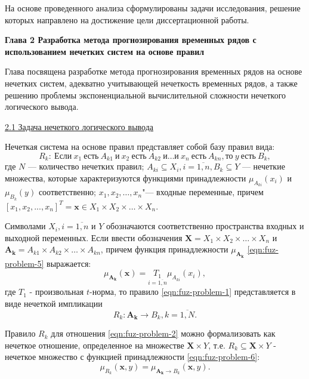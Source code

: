 На основе проведенного анализа сформулированы задачи исследования, решение которых направлено на достижение цели диссертационной работы.

\textbf{Глава 2 Разработка метода прогнозирования временных рядов с использованием нечетких систем на основе правил}

Глава посвящена разработке метода прогнозирования временных рядов на основе нечетких систем, адекватно учитывающей нечеткость временных рядов, а также решению проблемы экспоненциальной вычислительной сложности нечеткого логического вывода.

\ul{2.1 Задача нечеткого логического вывода}

Нечеткая система на основе правил представляет собой базу правил вида:
\begin{equation}
	\label{eqn:fuz-problem-1}
	R_k:\ \text{Если}\ x_1\ \text{есть}\ A_{k1}\ \text{и}\ x_2\ \text{есть}\ A_{k2}\ \text{и} \dots \text{и}\ x_n\ \text{есть}\ A_{kn}, \text{то}\ y\ \text{есть}\ B_k,
\end{equation}
где $N$ --- количество нечетких правил;
${}$\quad\enspace$A_{ki} \subseteq X_i, i=\overline{1,n}, B_k \subseteq Y$ --- нечеткие множества, которые характеризуются функциями принадлежности $\mu_{A_{ki}}(x_i)$ и $\mu_{B_k}(y)$ соответственно;
${}$\quad\enspace$x_1, x_2,…,x_n$"--- входные переменные, причем $[x_1, x_2, ..., x_n]^T = \mathbf{x} \in X_1 \times X_2 \times \dots \times X_n$.

Символами  $X_i, i=\overline{1,n}$ и $Y$ обозначаются соответственно пространства входных и выходной переменных. Если ввести обозначения $\mathbf{X}=X_1 \times X_2 \times \dots \times X_n$ и $\mathbf{A_k}=A_{k1}\times A_{k2} \times \dots \times A_{kn}$, причем функция принадлежности $\mu_{\mathbf{A_k}}$ \eqref{eqn:fuz-problem-5} выражается:
\begin{equation}
	\label{eqn:fuz-problem-5}
	\mu_\mathbf{A_k}(\mathbf{x}) = \underset{i=\overline{1,n}}{T_1} \mu_{A_{ki}}(x_i),
\end{equation}
где $T_1$ - произвольная $t$-норма, то правило \ref{eqn:fuz-problem-1} представляется в виде нечеткой импликации
\begin{equation}
	\label{eqn:fuz-problem-2}
	R_k: \mathbf{A_k} \to B_k, k=\overline{1,N}.
\end{equation}

Правило $R_k$ для отношения \eqref{eqn:fuz-problem-2} можно формализовать как нечеткое отношение, определенное на множестве  $\mathbf{X}\times Y$, т.е. $R_k \subseteq \mathbf{X} \times Y$ - нечеткое множество с функцией принадлежности \eqref{eqn:fuz-problem-6}:
\begin{equation}
	\label{eqn:fuz-problem-6}
	\mu_{R_k}(\mathbf{x}, y) = \mu_{\mathbf{A_k} \to B_k} (\mathbf{x}, y).
\end{equation}

